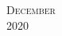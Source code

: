 \documentclass[10pt]{article} %
\begin{document}
\pagestyle{empty} %

\setlength{\parindent}{0pt} %



\begin{center}
	\textsc{\LARGE December}\\ %
	\textsc{\large 2020} %
\end{center}

\end{document}
